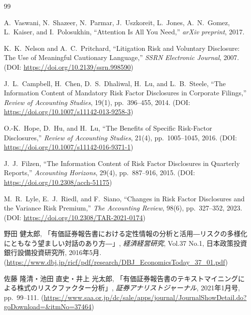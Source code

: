 \begin{thebibliography}{99}


  A.~Vaswani, N.~Shazeer, N.~Parmar, J.~Uszkoreit, L.~Jones, A.~N.~Gomez, L.~Kaiser, and I.~Polosukhin,
  ``Attention Is All You Need,''
  \textit{arXiv preprint}, 2017.

  K.~K.~Nelson and A.~C.~Pritchard,
  ``Litigation Risk and Voluntary Disclosure: The Use of Meaningful Cautionary Language,''
  \textit{SSRN Electronic Journal}, 2007.
  (DOI: \url{https://doi.org/10.2139/ssrn.998590})

  J.~L.~Campbell, H.~Chen, D.~S.~Dhaliwal, H.~Lu, and L.~B.~Steele,
  ``The Information Content of Mandatory Risk Factor Disclosures in Corporate Filings,''
  \textit{Review of Accounting Studies}, 19(1), pp.~396--455, 2014.
  (DOI: \url{https://doi.org/10.1007/s11142-013-9258-3})

  O.-K.~Hope, D.~Hu, and H.~Lu,
  ``The Benefits of Specific Risk-Factor Disclosures,''
  \textit{Review of Accounting Studies}, 21(4), pp.~1005--1045, 2016.
  (DOI: \url{https://doi.org/10.1007/s11142-016-9371-1})

  J.~J.~Filzen,
  ``The Information Content of Risk Factor Disclosures in Quarterly Reports,''
  \textit{Accounting Horizons}, 29(4), pp.~887--916, 2015.
  (DOI: \url{https://doi.org/10.2308/acch-51175})

  M.~R.~Lyle, E.~J.~Riedl, and F.~Siano,
  ``Changes in Risk Factor Disclosures and the Variance Risk Premium,''
  \textit{The Accounting Review}, 98(6), pp.~327--352, 2023.
  (DOI: \url{https://doi.org/10.2308/TAR-2021-0174})

  野田 健太郎,
  「有価証券報告書における定性情報の分析と活用―リスクの多様化にともなう望ましい対話のあり方―」,
  \textit{経済経営研究}, Vol.37 No.1, 日本政策投資銀行設備投資研究所, 2016年5月.
  (\url{https://www.dbj.jp/ricf/pdf/research/DBJ_EconomicsToday_37_01.pdf})

  佐藤 隆清・池田 直史・井上 光太郎,
  「有価証券報告書のテキストマイニングによる株式のリスクファクター分析」,
  \textit{証券アナリストジャーナル}, 2021年1月号, pp.~99--111.
  (\url{https://www.saa.or.jp/dc/sale/apps/journal/JournalShowDetail.do?goDownload=&itmNo=37464})


\end{thebibliography}
